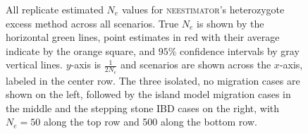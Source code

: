 \begin{landscape}
\begin{figure}[ht]
\centering
{}
\caption[All replicate estimated $N_e$ values for \textsc{neestimator}'s heterozygote excess method across all scenarios.]{All replicate estimated $N_e$ values for \textsc{neestimator}'s heterozygote excess method across all scenarios. True $N_e$ is shown by the horizontal green lines, point estimates in red with their average indicate by the orange square, and $95\%$ confidence intervals by gray vertical lines. $y$-axis is $\frac{1}{2 N_e}$ and scenarios are shown across the $x$-axis, labeled in the center row. The three isolated, no migration cases are shown on the left, followed by the island model migration cases in the middle and the stepping stone IBD cases on the right, with $N_e = 50$ along the top row and 500 along the bottom row.}
\label{fig:supp_neesthet}
\end{figure}



\end{landscape}
